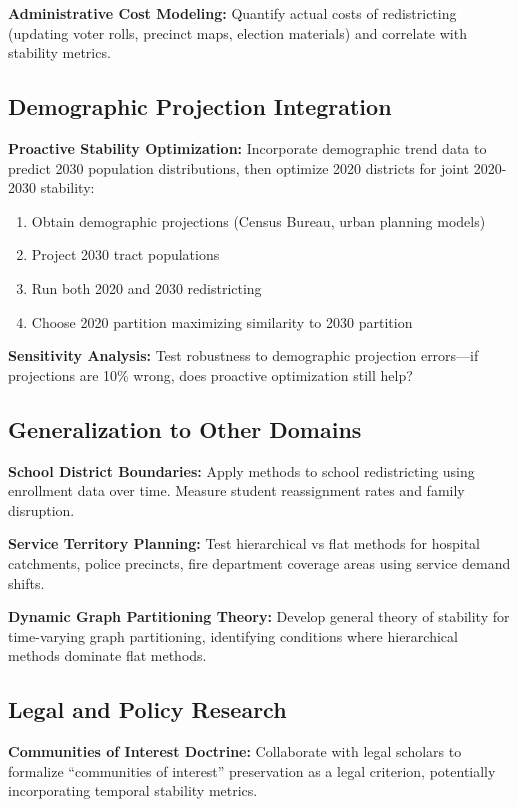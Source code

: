 \textbf{Administrative Cost Modeling:} Quantify actual costs of redistricting (updating voter rolls, precinct maps, election materials) and correlate with stability metrics.

\subsection{Demographic Projection Integration}

\textbf{Proactive Stability Optimization:} Incorporate demographic trend data to predict 2030 population distributions, then optimize 2020 districts for joint 2020-2030 stability:
\begin{enumerate}
    \item Obtain demographic projections (Census Bureau, urban planning models)
    \item Project 2030 tract populations
    \item Run both 2020 and 2030 redistricting
    \item Choose 2020 partition maximizing similarity to 2030 partition
\end{enumerate}

\textbf{Sensitivity Analysis:} Test robustness to demographic projection errors—if projections are 10\% wrong, does proactive optimization still help?

\subsection{Generalization to Other Domains}

\textbf{School District Boundaries:} Apply methods to school redistricting using enrollment data over time. Measure student reassignment rates and family disruption.

\textbf{Service Territory Planning:} Test hierarchical vs flat methods for hospital catchments, police precincts, fire department coverage areas using service demand shifts.

\textbf{Dynamic Graph Partitioning Theory:} Develop general theory of stability for time-varying graph partitioning, identifying conditions where hierarchical methods dominate flat methods.

\subsection{Legal and Policy Research}

\textbf{Communities of Interest Doctrine:} Collaborate with legal scholars to formalize ``communities of interest'' preservation as a legal criterion, potentially incorporating temporal stability metrics.

